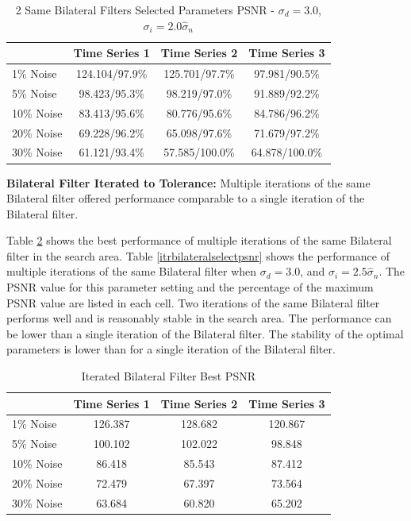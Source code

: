 \documentclass[11pt]{article}
\newcommand{\vs}{\vspace{0.1in}}
\theoremstyle{definition}
\begin{document}
\begin{table}[!h]
\small
\begin{center}
\begin{tabular}{l | c | c | c}
 & Time Series 1 & Time Series 2 & Time Series 3 \\ \hline
1\% Noise & 124.104/97.9\% & 125.701/97.7\% & 97.981/90.5\% \\ \hline
5\% Noise & 98.423/95.3\% & 98.219/97.0\% & 91.889/92.2\% \\ \hline
10\% Noise & 83.413/95.6\% & 80.776/95.6\% & 84.786/96.2\% \\ \hline
20\% Noise & 69.228/96.2\% & 65.098/97.6\% & 71.679/97.2\% \\ \hline
30\% Noise & 61.121/93.4\% & 57.585/100.0\% & 64.878/100.0\%
\end{tabular}
\caption{2 Same Bilateral Filters Selected Parameters PSNR - $\sigma_d = 3.0$, $\sigma_i = 2.0 \hat{\sigma}_n$}
\label{2samebilateralselectpsnr}
\end{center}
\end{table}

\vs
\textbf{Bilateral Filter Iterated to Tolerance:} Multiple iterations of the same Bilateral filter offered performance comparable to a single iteration of the Bilateral filter.

Table \ref{itrbilateralbestpsnr} shows the best performance of multiple iterations of the same Bilateral filter in the search area. Table \ref{itrbilateralselectpsnr} shows the performance of multiple iterations of the same Bilateral filter when $\sigma_d = 3.0$, and $\sigma_i = 2.5 \hat{\sigma}_n$. The PSNR value for this parameter setting and the percentage of the maximum PSNR value are listed in each cell. Two iterations of the same Bilateral filter performs well and is reasonably stable in the search area. The performance can be lower than a single iteration of the Bilateral filter. The stability of the optimal parameters is lower than for a single iteration of the Bilateral filter.

\begin{table}[!h]
\small
\begin{center}
\begin{tabular}{l | c | c | c}
 & Time Series 1 & Time Series 2 & Time Series 3 \\ \hline
1\% Noise & 126.387 & 128.682 & 120.867 \\ \hline
5\% Noise & 100.102 & 102.022 & 98.848 \\ \hline
10\% Noise & 86.418 & 85.543 & 87.412 \\ \hline
20\% Noise & 72.479 & 67.397 & 73.564 \\ \hline
30\% Noise & 63.684 & 60.820 & 65.202
\end{tabular}
\caption{Iterated Bilateral Filter Best PSNR}
\label{itrbilateralbestpsnr}
\end{center}
\end{table}
\end{document}
